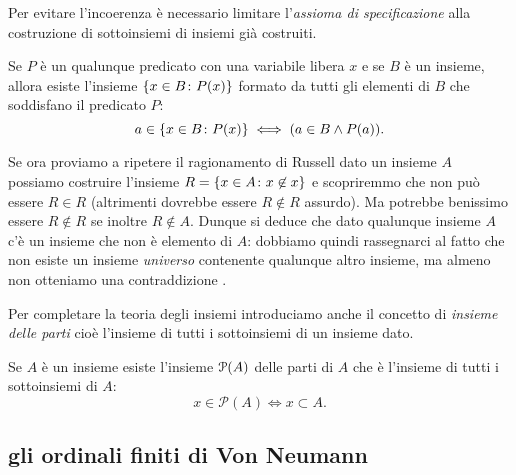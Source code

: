 Per evitare l'incoerenza è necessario limitare l'\emph{assioma di specificazione}
alla costruzione di sottoinsiemi di insiemi già costruiti.

\begin{axiom}[specificazione]
  Se $P$ è un qualunque predicato con una variabile libera $x$
  e se $B$ è un insieme, allora esiste l'insieme 
  $\ENCLOSE {x\in B\colon P(x)}$ formato 
  da tutti gli elementi di $B$ che soddisfano il predicato $P$:
\[
  a \in \ENCLOSE{x\in B\colon P(x)} \iff (a \in B \land P(a)).
\]
\end{axiom}

Se ora proviamo a ripetere il ragionamento di Russell dato un insieme $A$ 
possiamo costruire l'insieme $R=\ENCLOSE{x\in A\colon x\not \in x}$
e scopriremmo che non può essere $R\in R$ 
(altrimenti dovrebbe essere $R\not \in R$ assurdo).
Ma potrebbe benissimo essere $R\not \in R$ se inoltre $R\not \in A$.
Dunque si deduce che dato qualunque insieme $A$ c'è un insieme 
che non è elemento di $A$: dobbiamo quindi rassegnarci al fatto che non
esiste un insieme \emph{universo} contenente qualunque altro insieme,
ma almeno non otteniamo una contraddizione%
.

Per completare la teoria degli insiemi introduciamo anche il concetto di
\emph{insieme delle parti}%
%
% 
cioè l'insieme di tutti i sottoinsiemi di un insieme dato.
\begin{axiom}
\label{def:insieme_parti}%
Se $A$ è un insieme esiste l'insieme $\P(A)$ delle parti di $A$
che è l'insieme di tutti i sottoinsiemi di $A$:
\begin{equation}\label{eq:insieme_delle_parti}
  x \in \mathcal P(A) \iff x \subset A.
\end{equation}
\end{axiom}

\subsection{gli ordinali finiti di Von Neumann}

